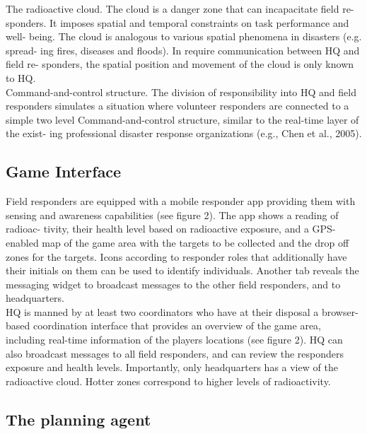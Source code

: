 The radioactive cloud. The cloud is a danger zone that can incapacitate field re- sponders. It imposes spatial and temporal constraints on task performance and well- being. The cloud is analogous to various spatial phenomena in disasters (e.g. spread- ing fires, diseases and floods). In require communication between HQ and field re- sponders, the spatial position and movement of the cloud is only known to HQ. \\

Command-and-control structure. The division of responsibility into HQ and field responders simulates a situation where volunteer responders are connected to a simple two level Command-and-control structure, similar to the real-time layer of the exist- ing professional disaster response organizations (e.g., Chen et al., 2005).\\



\subsection{Game Interface}
Field responders are equipped with a mobile responder app providing them with sensing and awareness capabilities (see figure 2). The app shows a reading of radioac- tivity, their health level based on radioactive exposure, and a GPS-enabled map of the game area with the targets to be collected and the drop off zones for the targets. Icons according to responder roles that additionally have their initials on them can be used to identify individuals. Another tab reveals the messaging widget to broadcast messages to the other field responders, and to headquarters.\\

HQ is manned by at least two coordinators who have at their disposal a browser- based coordination interface that provides an overview of the game area, including real-time information of the players locations (see figure 2). HQ can also broadcast messages to all field responders, and can review the responders exposure and health levels. Importantly, only headquarters has a view of the radioactive cloud. Hotter zones correspond to higher levels of radioactivity.\\


\subsection{The planning agent}







